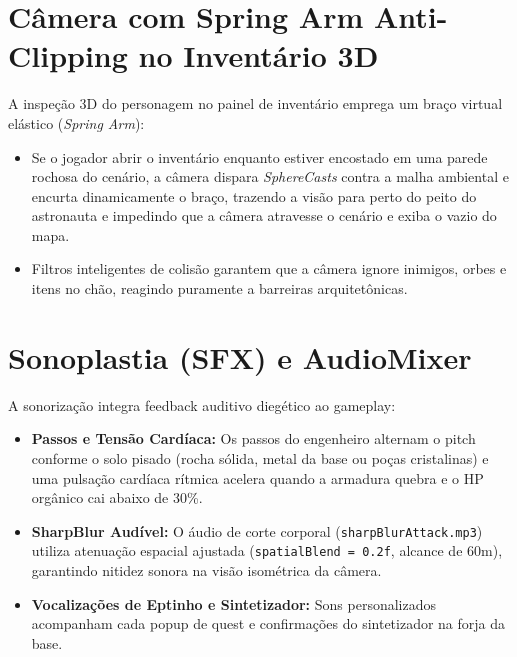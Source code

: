 \documentclass[a4paper,12pt]{report}
\begin{document}
\section{Câmera com Spring Arm Anti-Clipping no Inventário 3D}
A inspeção 3D do personagem no painel de inventário emprega um braço virtual elástico (\textit{Spring Arm}):
\begin{itemize}
    \item Se o jogador abrir o inventário enquanto estiver encostado em uma parede rochosa do cenário, a câmera dispara \textit{SphereCasts} contra a malha ambiental e encurta dinamicamente o braço, trazendo a visão para perto do peito do astronauta e impedindo que a câmera atravesse o cenário e exiba o vazio do mapa.
    \item Filtros inteligentes de colisão garantem que a câmera ignore inimigos, orbes e itens no chão, reagindo puramente a barreiras arquitetônicas.
\end{itemize}

\section{Sonoplastia (SFX) e AudioMixer}
A sonorização integra feedback auditivo diegético ao gameplay:
\begin{itemize}
    \item \textbf{Passos e Tensão Cardíaca:} Os passos do engenheiro alternam o pitch conforme o solo pisado (rocha sólida, metal da base ou poças cristalinas) e uma pulsação cardíaca rítmica acelera quando a armadura quebra e o HP orgânico cai abaixo de 30\%.
    \item \textbf{SharpBlur Audível:} O áudio de corte corporal (\texttt{sharpBlurAttack.mp3}) utiliza atenuação espacial ajustada (\texttt{spatialBlend = 0.2f}, alcance de 60m), garantindo nitidez sonora na visão isométrica da câmera.
    \item \textbf{Vocalizações de Eptinho e Sintetizador:} Sons personalizados acompanham cada popup de quest e confirmações do sintetizador na forja da base.
\end{itemize}
\end{document}
